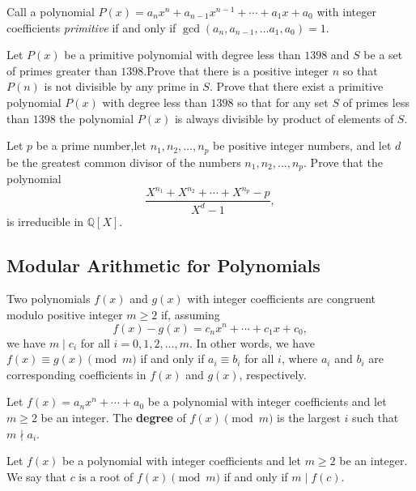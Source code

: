 \begin{question}[name={2019 Iran Third Round}]
    Call a polynomial $P(x)=a_nx^n+a_{n-1}x^{n-1}+\cdots +a_1x+a_0$ with integer coefficients \textit{primitive} if and only if $\gcd(a_n,a_{n-1},\dots a_1,a_0) =1$.
    \begin{tasks}
        \task Let $P(x)$ be a primitive polynomial with degree less than $1398$ and $S$ be a set of primes greater than $1398$.Prove that there is a positive integer $n$ so that $P(n)$ is not divisible by any prime in $S$.
        \task Prove that there exist a primitive polynomial $P(x)$ with degree less than $1398$ so that for any set $S$ of primes less than $1398$ the polynomial $P(x)$ is always divisible by product of elements of $S$.
    \end{tasks}
\end{question}


\begin{question}[name={2010 Romania TST}]
    Let $p$ be a prime number,let $n_1, n_2, \ldots, n_p$ be positive integer numbers, and let $d$ be the greatest common divisor of the numbers $n_1, n_2, \ldots, n_p$. Prove that the polynomial
    \[\dfrac{X^{n_1} + X^{n_2} + \cdots + X^{n_p} - p}{X^d - 1},\]
    is irreducible in $\mathbb{Q}[X]$.
\end{question}

\subsection{Modular Arithmetic for Polynomials}

\begin{tcolorbox}[title={Modular Arithmetic of Polynomials}]
\begin{definition}
    Two polynomials $f(x)$ and $g(x)$ with integer coefficients are congruent modulo positive integer $m\geq 2$ if, assuming \[f(x)-g(x)=c_nx^n+\cdots+c_1x+c_0,\] we have $m\mid c_i$ for all $i=0,1,2,\dots,m$. In other words, we have $f(x) \equiv g(x) \pmod m$ if and only if $a_i \equiv b_i$ for all $i$, where $a_i$ and $b_i$ are corresponding coefficients in $f(x)$ and $g(x)$, respectively.
\end{definition}

\begin{definition}
    Let $f(x)=a_nx^n+\cdots+a_0$ be a polynomial with integer coefficients and let $m\geq 2$ be an integer. The \textbf{degree} of $f(x) \pmod m$ is the largest $i$ such that $m \nmid a_i$.
\end{definition}

\begin{definition}
    Let $f(x)$ be a polynomial with integer coefficients and let $m\geq 2$ be an integer. We say that $c$ is a root of $f(x) \pmod m$ if and only if $m \mid f(c)$.
\end{definition}
\end{tcolorbox}

